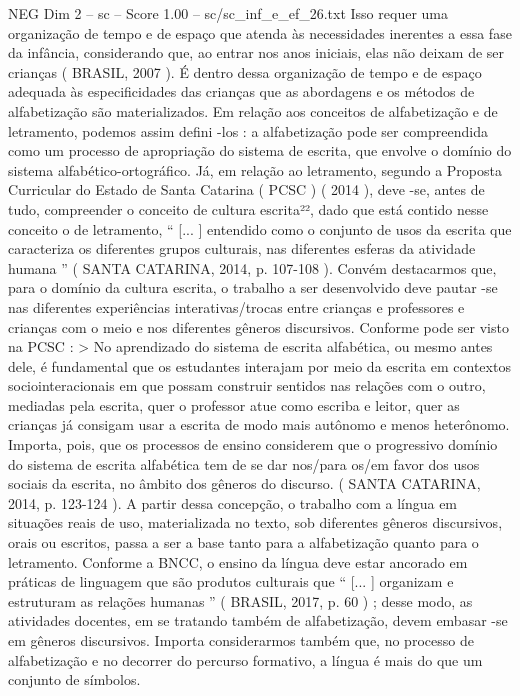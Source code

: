 \begin{textsample}{NEG Dim 2 – sc – Score 1.00 – sc/sc\_inf\_e\_ef\_26.txt}
Isso requer uma organização de tempo e de espaço que atenda às necessidades inerentes a essa fase da infância, considerando que, ao entrar nos anos iniciais, elas não deixam de ser crianças ( BRASIL, 2007 ).
É dentro dessa organização de tempo e de espaço adequada às especificidades das crianças que as abordagens e os métodos de alfabetização são materializados.
Em relação aos conceitos de alfabetização e de letramento, podemos assim defini -los : a alfabetização pode ser compreendida como um processo de apropriação do sistema de escrita, que envolve o domínio do sistema alfabético-ortográfico.
Já, em relação ao letramento, segundo a Proposta Curricular do Estado de Santa Catarina ( PCSC ) ( 2014 ), deve -se, antes de tudo, compreender o conceito de cultura escrita²², dado que está contido nesse conceito o de letramento, “ [... ] entendido como o conjunto de usos da escrita que caracteriza os diferentes grupos culturais, nas diferentes esferas da atividade humana ” ( SANTA CATARINA, 2014, p. 107-108 ).
Convém destacarmos que, para o domínio da cultura escrita, o trabalho a ser desenvolvido deve pautar -se nas diferentes experiências interativas/trocas entre crianças e professores e crianças com o meio e nos diferentes gêneros discursivos.
Conforme pode ser visto na PCSC : > No aprendizado do sistema de escrita alfabética, ou mesmo antes dele, é fundamental que os estudantes interajam por meio da escrita em contextos sociointeracionais em que possam construir sentidos nas relações com o outro, mediadas pela escrita, quer o professor atue como escriba e leitor, quer as crianças já consigam usar a escrita de modo mais autônomo e menos heterônomo.
Importa, pois, que os processos de ensino considerem que o progressivo domínio do sistema de escrita alfabética tem de se dar nos/para os/em favor dos usos sociais da escrita, no âmbito dos gêneros do discurso. ( SANTA CATARINA, 2014, p. 123-124 ).
A partir dessa concepção, o trabalho com a língua em situações reais de uso, materializada no texto, sob diferentes gêneros discursivos, orais ou escritos, passa a ser a base tanto para a alfabetização quanto para o letramento.
Conforme a BNCC, o ensino da língua deve estar ancorado em práticas de linguagem que são produtos culturais que “ [... ] organizam e estruturam as relações humanas ” ( BRASIL, 2017, p. 60 ) ; desse modo, as atividades docentes, em se tratando também de alfabetização, devem embasar -se em gêneros discursivos.
Importa considerarmos também que, no processo de alfabetização e no decorrer do percurso formativo, a língua é mais do que um conjunto de símbolos.

\end{textsample}
